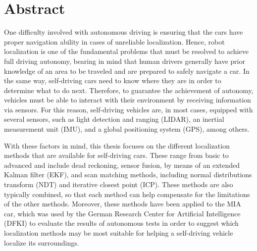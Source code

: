\chapter*{Abstract}
One difficulty involved with autonomous driving is ensuring that the cars have proper navigation ability in cases of unreliable localization. Hence, robot localization is one of the fundamental problems that must be resolved to achieve full driving autonomy, bearing in mind that human drivers generally have prior knowledge of an area to be traveled and are prepared to safely navigate a car. In the same way, self-driving cars need to know where they are in order to determine what to do next. Therefore, to guarantee the achievement of autonomy, vehicles must be able to interact with their environment by receiving information via sensors. For this reason, self-driving vehicles are, in most cases, equipped with several sensors, such as light detection and ranging (LIDAR), an inertial measurement unit (IMU), and a global positioning system (GPS), among others.
\par With these factors in mind, this thesis focuses on the different localization methods that are available for self-driving cars. These range from basic to advanced and include dead reckoning, sensor fusion, by means of an extended Kalman filter (EKF), and scan matching methods, including normal distributions transform (NDT) and iterative closest point (ICP). These methods are also typically combined, so that each method can help compensate for the limitations of the other methods. Moreover, these methods have been applied to the MIA car, which was used by the German Research Center for Artificial Intelligence (DFKI) to evaluate the results of autonomous tests in order to suggest which localization methods may be most suitable for helping a self-driving vehicle localize its surroundings.





